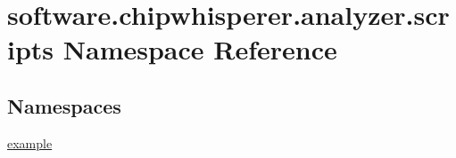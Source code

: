 \hypertarget{namespacesoftware_1_1chipwhisperer_1_1analyzer_1_1scripts}{}\section{software.\+chipwhisperer.\+analyzer.\+scripts Namespace Reference}
\label{namespacesoftware_1_1chipwhisperer_1_1analyzer_1_1scripts}
\subsection*{Namespaces}
\begin{DoxyCompactItemize}
\item 
 \hyperlink{namespacesoftware_1_1chipwhisperer_1_1analyzer_1_1scripts_1_1example}{example}
\end{DoxyCompactItemize}
